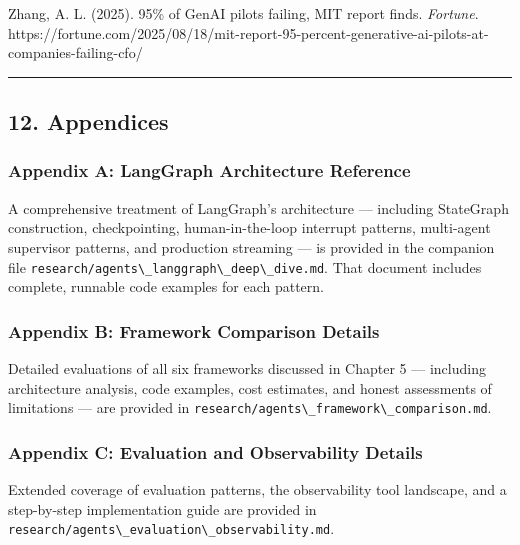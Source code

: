 \documentclass[11pt, a4paper]{article}
\newcommand{\passthrough}[1]{#1}
\begin{document}
Zhang, A. L. (2025). 95\% of GenAI pilots failing, MIT report finds.
\emph{Fortune}.
https://fortune.com/2025/08/18/mit-report-95-percent-generative-ai-pilots-at-companies-failing-cfo/

\begin{center}\rule{0.5\linewidth}{0.5pt}\end{center}

\hypertarget{appendices}{%
\subsection{12. Appendices}\label{appendices}}

\hypertarget{appendix-a-langgraph-architecture-reference}{%
\subsubsection{Appendix A: LangGraph Architecture
Reference}\label{appendix-a-langgraph-architecture-reference}}

A comprehensive treatment of LangGraph's architecture --- including
StateGraph construction, checkpointing, human-in-the-loop interrupt
patterns, multi-agent supervisor patterns, and production streaming ---
is provided in the companion file
\passthrough{\lstinline!research/agents\_langgraph\_deep\_dive.md!}.
That document includes complete, runnable code examples for each
pattern.

\hypertarget{appendix-b-framework-comparison-details}{%
\subsubsection{Appendix B: Framework Comparison
Details}\label{appendix-b-framework-comparison-details}}

Detailed evaluations of all six frameworks discussed in Chapter 5 ---
including architecture analysis, code examples, cost estimates, and
honest assessments of limitations --- are provided in
\passthrough{\lstinline!research/agents\_framework\_comparison.md!}.

\hypertarget{appendix-c-evaluation-and-observability-details}{%
\subsubsection{Appendix C: Evaluation and Observability
Details}\label{appendix-c-evaluation-and-observability-details}}

Extended coverage of evaluation patterns, the observability tool
landscape, and a step-by-step implementation guide are provided in
\passthrough{\lstinline!research/agents\_evaluation\_observability.md!}.
\end{document}
